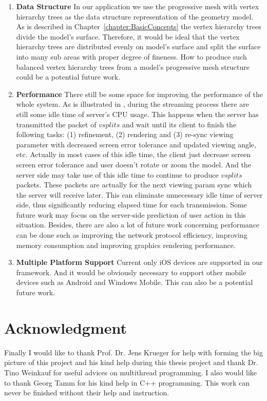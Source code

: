 \begin{enumerate}
\item
\textbf{Data Structure}	In our application we use the progressive mesh with vertex hierarchy trees as the data structure representation of the geometry model. As is described in Chapter~\ref{chapter:BasicConcepts} the vertex hierarchy trees divide the model's surface. Therefore, it would be ideal that the vertex hierarchy trees are distributed evenly on model's surface and split the surface into many sub areas with proper degree of fineness. How to produce such balanced vertex hierarchy trees from a model's progressive mesh structure could be a potential future work. 

\item
\textbf{Performance}		There still be some space for improving the performance of the whole system. As is illustrated in , during the streaming process there are still some idle time of server's CPU usage. This happens when the server has transmitted the packet of $vsplits$ and wait until its client to finish the following tasks: (1) refinement, (2) rendering and (3) re-sync viewing parameter with decreased screen error tolerance and updated viewing angle, etc. Actually in most cases of this idle time, the client just decrease screen screen error tolerance and user doesn't rotate or zoom the model. And the server side may take use of this idle time to continue to produce $vsplits$ packets. These packets are actually for the next viewing param sync which the server will receive later. This can eliminate unnecessary idle time of server side, thus significantly reducing elapsed time for each transmission. Some future work may focus on the server-side prediction of user action in this situation. Besides, there are also a lot of future work concerning performance can be done such as improving the network protocol efficiency, improving memory consumption and improving graphics rendering performance. 

\item
\textbf{Multiple Platform Support}	Current only iOS devices are supported in our framework. And it would be obviously necessary to support other mobile devices such as Android and Windows Mobile. This can also be a potential future work. 

\end{enumerate}

\section{Acknowledgment}
\label{section:acknowledgement}
Finally I would like to thank Prof. Dr. Jens Krueger for help with forming the big picture of this project and his kind help during this thesis project and thank Dr. Tino Weinkauf for useful advices on multithread programming. I also would like to thank Georg Tamm for his kind help in C++ programming. This work can never be finished without their help and instruction. 



